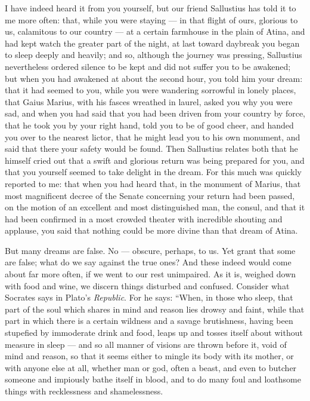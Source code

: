  I have indeed heard it from you yourself, but our friend Sallustius has told it to me more often: that, while you were staying — in that flight of ours, glorious to us, calamitous to our country — at a certain farmhouse in the plain of Atina, and had kept watch the greater part of the night, at last toward daybreak you began to sleep deeply and heavily; and so, although the journey was pressing, Sallustius nevertheless ordered silence to be kept and did not suffer you to be awakened; but when you had awakened at about the second hour, you told him your dream: that it had seemed to you, while you were wandering sorrowful in lonely places, that Gaius Marius, with his fasces wreathed in laurel, asked you why you were sad, and when you had said that you had been driven from your country by force, that he took you by your right hand, told you to be of good cheer, and handed you over to the nearest lictor, that he might lead you to his own monument, and said that there your safety would be found. Then Sallustius relates both that he himself cried out that a swift and glorious return was being prepared for you, and that you yourself seemed to take delight in the dream. For this much was quickly reported to me: that when you had heard that, in the monument of Marius, that most magnificent decree of the Senate concerning your return had been passed, on the motion of an excellent and most distinguished man, the consul, and that it had been confirmed in a most crowded theater with incredible shouting and applause, you said that nothing could be more divine than that dream of Atina.

 But many dreams are false. No — obscure, perhaps, to us. Yet grant that some are false; what do we say against the true ones? And these indeed would come about far more often, if we went to our rest unimpaired. As it is, weighed down with food and wine, we discern things disturbed and confused. Consider what Socrates says in Plato's \textit{Republic}. For he says: ``When, in those who sleep, that part of the soul which shares in mind and reason lies drowsy and faint, while that part in which there is a certain wildness and a savage brutishness, having been stupefied by immoderate drink and food, leaps up and tosses itself about without measure in sleep — and so all manner of visions are thrown before it, void of mind and reason, so that it seems either to mingle its body with its mother, or with anyone else at all, whether man or god, often a beast, and even to butcher someone and impiously bathe itself in blood, and to do many foul and loathsome things with recklessness and shamelessness.

